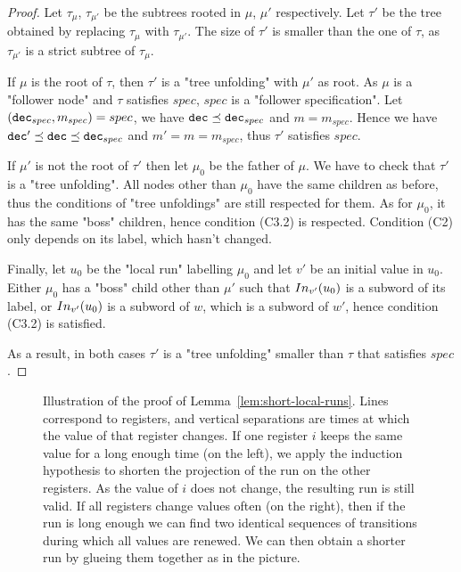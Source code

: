 \begin{proof}
		Let $\tau_{\mu}$, $\tau_{\mu'}$ be the subtrees rooted in $\mu$, $\mu'$ respectively. 
	Let $\tau'$ be the tree obtained by replacing $\tau_{\mu}$ with $\tau_{\mu'}$. The size of $\tau'$ is smaller than the one of $\tau$, as $\tau_{\mu'}$ is a strict subtree of $\tau_{\mu}$.
	
	If $\mu$ is the root of $\tau$, then $\tau'$ is a "tree unfolding" with $\mu'$ as root. As $\mu$ is a "follower node" and $\tau$ satisfies $spec$, $spec$ is a "follower specification". Let $(\mathtt{dec}_{spec}, m_{spec}) = spec$, we have $\mathtt{dec} \preceq \mathtt{dec}_{spec}$ and $m = m_{spec}$. 
	Hence we have $\mathtt{dec}' \preceq \mathtt{dec} \preceq \mathtt{dec}_{spec}$ and $m' = m = m_{spec}$, thus $\tau'$ satisfies $spec$.
	
	If  $\mu'$ is not the root of $\tau'$ then let $\mu_0$ be the father of $\mu$. We have to check that $\tau'$ is a "tree unfolding". 
	All nodes other than $\mu_0$ have the same children as before, thus the conditions of "tree unfoldings" are still respected for them.
	As for $\mu_0$, it has the same "boss" children, hence condition (C3.2) is respected. Condition (C2) only depends on its label, which hasn't changed.
	
	Finally, let $u_0$ be the "local run" labelling $\mu_0$ and let $v'$ be an initial value in $u_0$. Either $\mu_0$ has a "boss" child other than $\mu'$ such that $In_{v'}(u_0)$ is a subword of its label, or $In_{v'}(u_0)$ is a subword of $w$, which is a subword of $w'$, hence condition (C3.2) is satisfied. 
	
	As a result, in both cases $\tau'$ is a "tree unfolding" smaller than $\tau$ that satisfies $spec$. 
\end{proof}


\begin{figure}
	
	\caption{Illustration of the proof of Lemma~\ref{lem:short-local-runs}. Lines correspond to registers, and vertical separations are times at which the value of that register changes. If one register $i$ keeps the same value for a long enough time (on the left), we apply the induction hypothesis to shorten the projection of the run on the other registers. As the value of $i$ does not change, the resulting run is still valid. If all registers change values often (on the right), then if the run is long enough we can find two identical sequences of transitions during which all values are renewed. We can then obtain a shorter run by glueing them together as in the picture.}
\end{figure}

